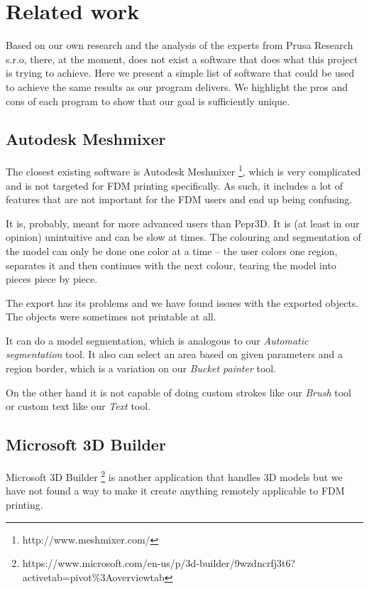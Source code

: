 
\chapter{Related work}

Based on our own research and the analysis of the experts from Prusa Research s.r.o, there, at the moment, does not exist a software that does what this project is trying to achieve. Here we present a simple list of software that could be used to achieve the same results as our program delivers. We highlight the pros and cons of each program to show that our goal is sufficiently unique.

\section{Autodesk Meshmixer}

The closest existing software is Autodesk Meshmixer \footnote{http://www.meshmixer.com/}, which is very complicated and is not targeted for FDM printing specifically. As such, it includes a lot of features that are not important for the FDM users and end up being confusing.

It is, probably, meant for more advanced users than Pepr3D. It is (at least in our opinion) unintuitive and can be slow at times. The colouring and segmentation of the model can only be done one color at a time -- the user colors one region, separates it and then continues with the next colour, tearing the model into pieces piece by piece.

The export has its problems and we have found issues with the exported objects. The objects were sometimes not printable at all.

It can do a model segmentation, which is analogous to our \textit{Automatic segmentation} tool. It also can select an area based on given parameters and a region border, which is a variation on our \textit{Bucket painter} tool.

On the other hand it is not capable of doing custom strokes like our \textit{Brush} tool or custom text like our \textit{Text} tool.

\section{Microsoft 3D Builder}

Microsoft 3D Builder \footnote{https://www.microsoft.com/en-us/p/3d-builder\-/9wzdncrfj3t6?activetab=pivot\%3Aoverviewtab} is another application that handles 3D models but we have not found a way to make it create anything remotely applicable to FDM printing.

